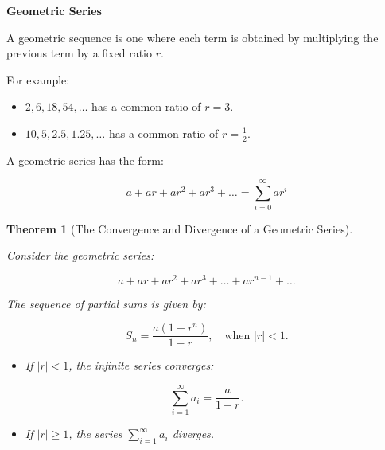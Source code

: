 \documentclass[
]{book}
\providecommand{\tightlist}{%
  \setlength{\itemsep}{0pt}\setlength{\parskip}{0pt}}
\newtheorem{theorem}{Theorem}[chapter]
\theoremstyle{definition}
\theoremstyle{definition}
\theoremstyle{definition}
\theoremstyle{definition}
\theoremstyle{remark}
\begin{document}
\textbf{Geometric Series}

A geometric sequence is one where each term is obtained by multiplying the previous term by a fixed ratio \(r\).

For example:

\begin{itemize}
\tightlist
\item
  \(2, 6, 18, 54, \dots\) has a common ratio of \(r = 3\).
\item
  \(10, 5, 2.5, 1.25, \dots\) has a common ratio of \(r = \frac{1}{2}\).
\end{itemize}

A geometric series has the form:

\[
a + ar + ar^2 + ar^3 + \dots = \sum_{i=0}^{\infty} ar^i
\]

\begin{theorem}[The Convergence and Divergence of a Geometric Series]
\protect\hypertarget{thm:unnamed-chunk-1}{}\label{thm:unnamed-chunk-1}

Consider the geometric series:

\[
a + ar + ar^2 + ar^3 + \dots + ar^{n-1} + \dots
\]

The sequence of partial sums is given by:

\[
S_n = \frac{a(1 - r^n)}{1 - r}, \quad \text{when } |r| < 1.
\]

\begin{itemize}
\tightlist
\item
  If \(|r| < 1\), the infinite series converges:
\end{itemize}

\[
\sum_{i=1}^\infty a_i = \frac{a}{1 - r}.
\]

\begin{itemize}
\tightlist
\item
  If \(|r| \geq 1\), the series \(\sum_{i=1}^\infty a_i\) diverges.
\end{itemize}

\end{theorem}
\end{document}

